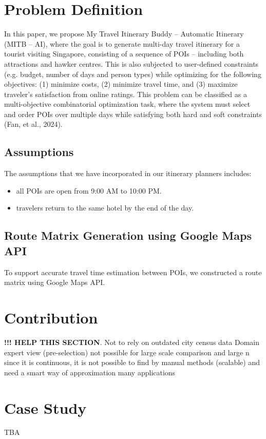 \documentclass{ecai}
\begin{document}
\section{Problem Definition}
In this paper, we propose My Travel Itinerary Buddy – Automatic Itinerary (MITB – AI), where the goal is to generate multi-day travel itinerary for a tourist visiting Singapore, consisting of a sequence of POIs – including both attractions and hawker centres. This is also subjected to user-defined constraints (e.g. budget, number of days and person types) while optimizing for the following objectives: (1) minimize costs, (2) minimize travel time, and (3) maximize traveler’s satisfaction from online ratings. This problem can be classified as a multi-objective combinatorial optimization task, where the system must select and order POIs over multiple days while satisfying both hard and soft constraints (Fan, et al., 2024).

\subsection{Assumptions}
The assumptions that we have incorporated in our itinerary planners includes: 
\begin{itemize}
    \item all POIs are open from 9:00 AM to 10:00 PM.
    \item travelers return to the same hotel by the end of the day.
\end{itemize}

\subsection{Route Matrix Generation using Google Maps API}
To support accurate travel time estimation between POIs, we constructed a route matrix using Google Maps API.

\section{Contribution}
\textbf{!!! HELP THIS SECTION}.  Not to rely on outdated city census data
Domain expert view (pre-selection) not possible for large scale comparison and large n
since it is continuous, it is not possible to find by manual methods (scalable) and need a smart way of approximation
many applications

\section{Case Study}
TBA
\end{document}
